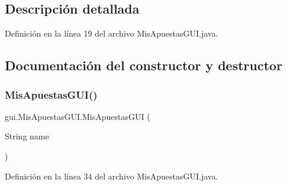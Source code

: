 \subsection{Descripción detallada}


Definición en la línea 19 del archivo Mis\+Apuestas\+G\+U\+I.\+java.



\subsection{Documentación del constructor y destructor}
\mbox{\label{classgui_1_1MisApuestasGUI_ae0499aafa67f1c44bb02c39fdfc3c93c}} 
\subsubsection{\texorpdfstring{MisApuestasGUI()}{MisApuestasGUI()}}
{\footnotesize\ttfamily gui.\+Mis\+Apuestas\+G\+U\+I.\+Mis\+Apuestas\+G\+UI (\begin{DoxyParamCaption}\item[{String}]{name }\end{DoxyParamCaption})}



Definición en la línea 34 del archivo Mis\+Apuestas\+G\+U\+I.\+java.


